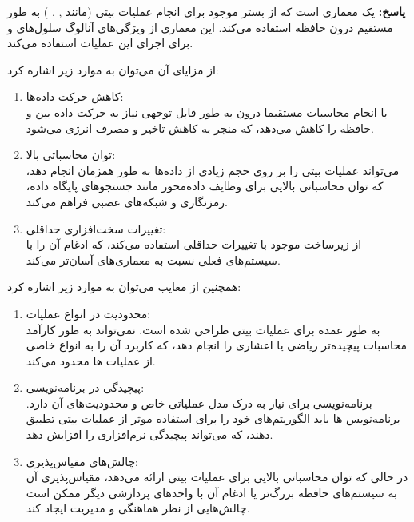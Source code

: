 \documentclass[12pt]{exam}
\begin{document}
\begin{questions}
\begin{enumerate}
	\textbf{پاسخ:} 
یک معماری  است که از بستر  موجود برای انجام عملیات بیتی (مانند , , ) به طور مستقیم درون حافظه استفاده می‌کند. این معماری از ویژگی‌های آنالوگ سلول‌های  و  برای اجرای این عملیات استفاده می‌کند.

از مزایای آن می‌توان به موارد زیر اشاره کرد:

\begin{enumerate}
	\item کاهش حرکت داده‌ها:\\
با انجام محاسبات مستقیما درون  به طور قابل توجهی نیاز به حرکت داده بین  و حافظه را کاهش می‌دهد، که منجر به کاهش تاخیر و مصرف انرژی می‌شود.

	\item توان محاسباتی بالا:\\
می‌تواند عملیات بیتی را بر روی حجم زیادی از داده‌ها به طور همزمان انجام دهد، که توان محاسباتی بالایی برای وظایف داده‌محور مانند جستجوهای پایگاه داده، رمزنگاری و شبکه‌های عصبی فراهم می‌کند.


	\item تغییرات سخت‌افزاری حداقلی:\\
از زیرساخت  موجود با تغییرات حداقلی استفاده می‌کند، که ادغام آن را با سیستم‌های فعلی نسبت به معماری‌های  آسان‌تر می‌کند.
\end{enumerate}


همچنین از معایب  می‌توان به موارد زیر اشاره کرد:

\begin{enumerate}
	\item محدودیت در انواع عملیات:\\
به طور عمده برای عملیات بیتی طراحی شده است. نمی‌تواند به طور کارآمد محاسبات پیچیده‌تر ریاضی یا اعشاری را انجام دهد، که کاربرد آن را به انواع خاصی از عملیات ها محدود می‌کند.


	\item پیچیدگی در برنامه‌نویسی:\\
برنامه‌نویسی برای  نیاز به درک مدل عملیاتی خاص و محدودیت‌های آن دارد. برنامه‌نویس ها باید الگوریتم‌های خود را برای استفاده موثر از عملیات بیتی تطبیق دهند، که می‌تواند پیچیدگی نرم‌افزاری را افزایش دهد.

	\item چالش‌های مقیاس‌پذیری:\\
در حالی که  توان محاسباتی بالایی برای عملیات بیتی ارائه می‌دهد، مقیاس‌پذیری آن به سیستم‌های حافظه بزرگ‌تر یا ادغام آن با واحدهای پردازشی دیگر ممکن است چالش‌هایی از نظر هماهنگی و مدیریت ایجاد کند.
\end{enumerate}



\end{enumerate}
\end{questions}
\end{document}
